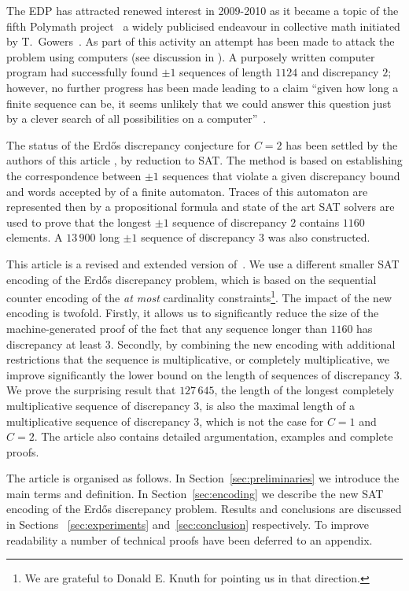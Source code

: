 \documentclass{article} \usepackage[utf8]{inputenc}
\begin{document}
The EDP has attracted renewed interest in 2009-2010  as it became a topic of the fifth
Poly\-math 
project~
a widely publicised endeavour in
collective math initiated by T.~Gowers~.   As part of this
activity  an attempt has been made
to attack the problem using computers (see discussion in \cite{Polymath}). A
purposely written computer program had successfully found $\pm1$ sequences of
length $1124$ and discrepancy $2$; however, no further progress has been made
leading to a claim ``given how long a finite sequence can
be, it seems unlikely that we could answer this question just by a clever
search of all possibilities on a computer''~\cite{Polymath}.


The status of the Erd\H{o}s discrepancy conjecture for $C=2$ has been
settled by the authors of this article 
\cite{KLArx14}, \cite{KLSAT14} by reduction to SAT.  The method is
based on establishing the correspondence between $\pm1$ sequences that violate
a given discrepancy bound and words accepted by of a finite automaton.  Traces
of this automaton are represented then by a propositional formula and state
of the art SAT solvers are used to prove that the longest $\pm1$ sequence of
discrepancy $2$ contains $1160$ elements. 
A $13\,900$ long $\pm1$ sequence of discrepancy $3$ was also constructed.

This article is a revised and extended version of~\cite{KLSAT14}.  We use a
different smaller SAT encoding of the Erd\H{o}s discrepancy problem, which is
based on the sequential counter encoding of the \emph{at
most} cardinality constraints\footnote{We are grateful to Donald E. Knuth for
pointing us in that direction.}. The impact of the new encoding is twofold.
Firstly, it allows us to significantly reduce the size of the machine-generated
proof of the fact that any sequence longer than $1160$  has discrepancy at
least $3$.
Secondly, by combining the new encoding with additional restrictions that the
sequence is multiplicative, or completely multiplicative, we improve
significantly the lower bound on the length of sequences of discrepancy $3$. We
prove the surprising result that $127\,645$, the length  of the longest completely multiplicative
sequence of discrepancy $3$, is also the maximal length of a 
multiplicative sequence of discrepancy $3$, which is not the case for $C=1$ and
$C=2$.  The article also contains
detailed argumentation, examples and complete proofs.

The article is organised as follows. In Section~\ref{sec:preliminaries} we
introduce the main terms and definition. In Section~\ref{sec:encoding} we
describe the new SAT encoding of the Erd\H{o}s discrepancy problem.
Results and conclusions are discussed in Sections ~\ref{sec:experiments}
and~\ref{sec:conclusion} respectively.  To improve readability a number of
technical proofs have been deferred to an appendix.
\end{document}
